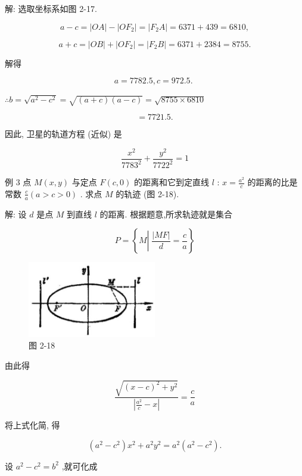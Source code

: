 \documentclass[lang=cn,newtx,10.5pt,scheme=chinese]{elegantbook}
\begin{document}
解: 选取坐标系如图 2-17.

\[
  a - c = \left| {OA}\right| - \left| {O{F}_{2}}\right| = \left| {{F}_{2}A}\right| = {6371} + {439} = {6810},
\]

\[
  a + c = \left| {OB}\right| + \left| {O{F}_{2}}\right| = \left| {{F}_{2}B}\right| = {6371} + {2384} = {8755}.
\]

解得

\[
  a = {7782.5},c = {972.5}\text{. }
\]

\(\therefore b = \sqrt{{a}^{2} - {c}^{2}} = \sqrt{\left( {a + c}\right) \left( {a - c}\right) } = \sqrt{{8755} \times {6810}}\)

\[
  = {7721.5}\text{.}
\]

因此, 卫星的轨道方程 (近似) 是

\[
  \frac{{x}^{2}}{{7783}^{2}} + \frac{{y}^{2}}{{7722}^{2}} = 1
\]

例 3 点 \(M\left( {x,y}\right)\) 与定点 \(F\left( {c,0}\right)\) 的距离和它到定直线 \(l\) : \(x = \frac{{a}^{2}}{c}\) 的距离的比是常数 \(\frac{c}{a}\left( {a > c > 0}\right)\) . 求点 \(M\) 的轨迹 (图 2-18).

解: 设 \(d\) 是点 \(M\) 到直线 \(l\) 的距离. 根据题意,所求轨迹就是集合

\[
  P = \left\{ {M\left| {\;\frac{\left| MF\right| }{d} = \frac{c}{a}}\right. }\right\}
\]

\begin{figure}[h]
  \centering
  \includegraphics[max width=0.5\textwidth]{images/01912cc2-ffb6-728e-9ae7-b113ff05c64b_93_181051.jpg}
  \caption{图 2-18}
\end{figure}



由此得

\[
  \frac{\sqrt{{\left( x - c\right) }^{2} + {y}^{2}}}{\left| \frac{{a}^{2}}{c} - x\right| } = \frac{c}{a}
\]

将上式化简, 得

\[
  \left( {{a}^{2} - {c}^{2}}\right) {x}^{2} + {a}^{2}{y}^{2} = {a}^{2}\left( {{a}^{2} - {c}^{2}}\right) .
\]

设 \({a}^{2} - {c}^{2} = {b}^{2}\) ,就可化成
\end{document}
